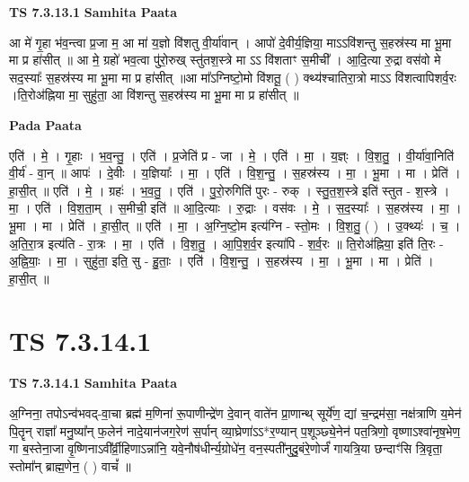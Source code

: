 \documentclass[17pt]{extarticle}
\begin{document}
\textbf{TS 7.3.13.1 } \newline
\textbf{Samhita Paata} \newline

आ मे॑ गृ॒हा भ॑व॒न्त्वा प्र॒जा म॒ आ मा॑ य॒ज्ञो वि॑शतु वी॒र्या॑वान् । आपो॑ दे॒वीर्य॒ज्ञिया॒ माऽऽवि॑शन्तु स॒हस्र॑स्य मा भू॒मा मा प्र हा॑सीत् ॥ आ मे॒ ग्रहो॑ भव॒त्वा पु॑रो॒रुख् स्तु॑तश॒स्त्रे मा ऽऽ वि॑शताꣳ स॒मीची᳚ । आ॒दि॒त्या रु॒द्रा वस॑वो मे सद॒स्याः᳚ स॒हस्र॑स्य मा भू॒मा मा प्र हा॑सीत् ॥आ मा᳚ऽग्निष्टो॒मो वि॑शतू॒ ( ) क्थ्य॑श्चातिरा॒त्रो माऽऽ वि॑शत्वापिशर्व॒रः ।ति॒रोअ॑ह्निया मा॒ सुहु॑ता॒ आ वि॑शन्तु स॒हस्र॑स्य मा भू॒मा मा प्र हा॑सीत् ॥ \newline

\textbf{Pada Paata} \newline

एति॑ । मे॒ । गृ॒हाः । भ॒व॒न्तु॒ । एति॑ । प्र॒जेति॑ प्र - जा । मे॒ । एति॑ । मा॒ । य॒ज्ञ्ः । वि॒श॒तु॒ । वी॒र्या॑वा॒निति॑ वी॒र्य॑ - वा॒न् ॥ आपः॑ । दे॒वीः । य॒ज्ञियाः᳚ । मा॒ । एति॑ । वि॒श॒न्तु॒ । स॒हस्र॑स्य । मा॒ । भू॒मा । मा । प्रेति॑ । हा॒सी॒त् ॥ एति॑ । मे॒ । ग्रहः॑ । भ॒व॒तु॒ । एति॑ । पु॒रो॒रुगिति॑ पुरः - रुक् । स्तु॒त॒श॒स्त्रे इति॑ स्तुत - श॒स्त्रे । मा॒ । एति॑ । वि॒श॒ता॒म् । स॒मीची॒ इति॑ ॥ आ॒दि॒त्याः । रु॒द्राः । वस॑वः । मे॒ । स॒द॒स्याः᳚ । स॒हस्र॑स्य । मा॒ । भू॒मा । मा । प्रेति॑ । हा॒सी॒त् ॥ एति॑ । मा॒ । अ॒ग्नि॒ष्टो॒म इत्य॑ग्नि - स्तो॒मः । वि॒श॒तु॒ ( ) । उ॒क्थ्यः॑ । च॒ । अ॒ति॒रा॒त्र इत्य॑ति - रा॒त्रः । मा॒ । एति॑ । वि॒श॒तु॒ । आ॒पि॒श॒र्व॒र इत्या॑पि - श॒र्व॒रः ॥ ति॒रो‌अ॑ह्निया॒ इति॑ ति॒रः - अ॒ह्नि॒याः॒ । मा॒ । सुहु॑ता॒ इति॒ सु - हु॒ताः॒ । एति॑ । वि॒श॒न्तु॒ । स॒हस्र॑स्य । मा॒ । भू॒मा । मा । प्रेति॑ । हा॒सी॒त् ॥  \newline





\section{ TS 7.3.14.1 }

\textbf{TS 7.3.14.1 } \newline
\textbf{Samhita Paata} \newline

अ॒ग्निना॒ तपोऽन्व॑भवद्-वा॒चा ब्रह्म॑ म॒णिना॑ रू॒पाणीन्द्रे॑ण दे॒वान् वाते॑न प्रा॒णान्थ् सूर्ये॑ण॒ द्यां च॒न्द्रम॑सा॒ नक्ष॑त्राणि य॒मेन॑ पि॒तॄन् राज्ञा᳚ मनु॒ष्या᳚न् फ॒लेन॑ नादे॒यान॑जग॒रेण॑ स॒र्पान् व्या॒घ्रेणा॑ऽऽ*र॒ण्यान् प॒शूञ्छ्ये॒नेन॑ पत॒त्रिणो॒ वृष्णाऽश्वा॑नृष॒भेण॒ गा ब॒स्तेना॒जा वृ॒ष्णिनाऽवी᳚र्व्री॒हिणाऽन्ना॑नि॒ यवे॒नौष॑धीर्न्य॒ग्रोधे॑न॒ वन॒स्पती॑नुदु॒बंरे॒णोर्जं॑ गायत्रि॒या छन्दाꣳ॑सि त्रि॒वृता॒ स्तोमा᳚न् ब्राह्म॒णेन॒ ( ) वाचं᳚ ॥ \newline
\end{document}
